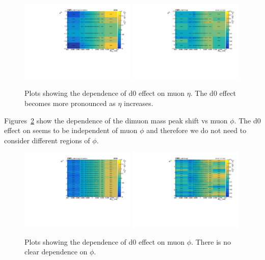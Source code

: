\begin{figure}[h!]
    \centering
    \includegraphics[width=0.49\textwidth]{images_geofit/dimu_mass_vs_eta_MC.pdf}
    \includegraphics[width=0.49\textwidth]{images_geofit/dimu_mass_vs_eta_data.pdf}
    \caption{Plots showing the dependence of d0 effect on muon $\eta$. The d0 effect becomes more pronounced as $\eta$ increases.}
    \label{fig:2D_d0_eta}
\end{figure}

Figures~\ref{fig:2D_d0_phi} show the dependence of the dimuon mass peak shift vs muon $\phi$. The d0 effect on \pt seems to be independent of muon $\phi$ and therefore we do not need to consider different regions of $\phi$.

\begin{figure}[h!]
    \centering
    \includegraphics[width=0.49\textwidth]{images_geofit/dimu_mass_vs_phi_MC.pdf}
    \includegraphics[width=0.49\textwidth]{images_geofit/dimu_mass_vs_phi_data.pdf}
    \caption{Plots showing the dependence of d0 effect on muon $\phi$. There is no clear dependence on $\phi$.}
    \label{fig:2D_d0_phi}
\end{figure}

